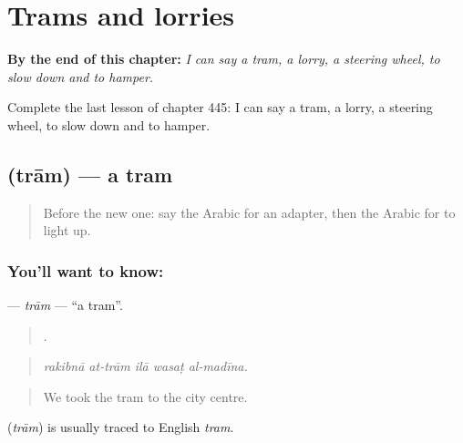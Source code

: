 
\chapter{Trams and lorries}
\label{ch:ar-trams-and-lorries}

\begin{chapteropening}
\textbf{By the end of this chapter:} \emph{I can say a tram, a lorry, a steering wheel, to slow down and to hamper.}

Complete the last lesson of chapter 445: I can say a tram, a lorry, a steering wheel, to slow down and to hamper.
\end{chapteropening}

\section[\texorpdfstring{\ar{ترام} (trām)}{ترام (trām)}]{ (trām) — a tram}

\label{lesson:AR-C445-tram}



\begin{quote}
Before the new one: say the Arabic for an adapter, then the Arabic for to light up.
\end{quote}

\subsection*{You'll want to know: }
\textbf{} — \emph{trām} — \textquotedblleft{}a tram\textquotedblright{}.

\begin{quote}
    .
\end{quote}

\begin{quote}
\emph{rakibnā at-trām ilā wasaṭ al-madīna.}
\end{quote}

\begin{quote}
We took the tram to the city centre.
\end{quote}

\begin{cousinweb}
\textbf{} (\emph{trām}) is usually traced to English \emph{tram}.
\end{cousinweb}

